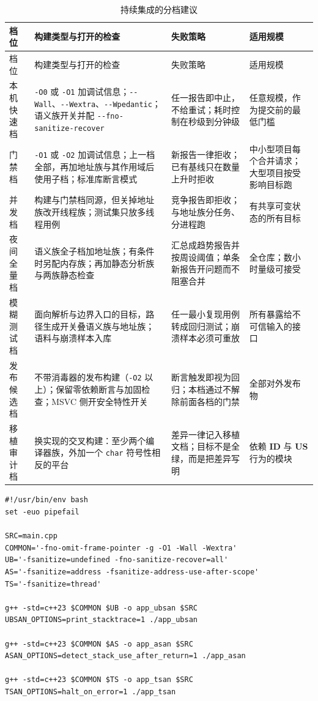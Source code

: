 \documentclass[12pt,a4paper,fontset=fandol]{ctexbook}
\newcommand{\Tp}[1]{\texttt{#1}}
\newcommand{\Opt}[1]{\texttt{-\/-#1}}
\newcommand{\Bk}{\discretionary{}{}{}}
\newcommand{\IDB}{\textbf{\textsf{ID}}}
\newcommand{\USB}{\textbf{\textsf{US}}}
\newcommand{\Mx}[1]{\textsf{#1}}
\begin{document}
\begin{longtable}{@{}>{\raggedright\arraybackslash}p{} >{\raggedright\arraybackslash}p{} >{\raggedright\arraybackslash}p{} >{\raggedright\arraybackslash}p{}@{}}
\caption{持续集成的分档建议}\label{tab:apB-ci}\\
\toprule
档位 & 构建类型与打开的检查 & 失败策略 & 适用规模 \\
\midrule
\endfirsthead
\toprule
档位 & 构建类型与打开的检查 & 失败策略 & 适用规模 \\
\midrule
\endhead
\bottomrule
\endfoot
本机快速档 & \Tp{-O0} 或 \Tp{-O1} 加调试信息；\Opt{Wall}、\Opt{Wextra}、\Opt{Wpedantic}；语义族开关并配 \Opt{fno-{\Bk}sanitize-{\Bk}recover} & 任一报告即中止，不给重试；耗时控制在秒级到分钟级 & 任意规模，作为提交前的最低门槛 \\
门禁档 & \Tp{-O1} 或 \Tp{-O2} 加调试信息；上一档全部，再加地址族与其作用域后使用子档；标准库断言模式 & 新报告一律拒收；已有基线只在数量上升时拒收 & 中小型项目每个合并请求；大型项目按受影响目标跑 \\
并发档 & 构建与门禁档同源，但关掉地址族改开线程族；测试集只放多线程用例 & 竞争报告即拒收；与地址族分任务、分进程跑 & 有共享可变状态的所有目标 \\
夜间全量档 & 语义族全子档加地址族；有条件时另配内存族；再加静态分析族与两族静态检查 & 汇总成趋势报告并按周设阈值；单条新报告开问题而不阻塞合并 & 全仓库；数小时量级可接受 \\
模糊测试档 & 面向解析与边界入口的目标，路径生成开关叠语义族与地址族；语料与崩溃样本入库 & 任一最小复现用例转成回归测试；崩溃样本必须可重放 & 所有暴露给不可信输入的接口 \\
发布候选档 & 不带消毒器的发布构建（\Tp{-O2} 以上）；保留零依赖断言与加固检查；\Mx{MSVC} 侧开安全特性开关 & 断言触发即视为回归；本档通过不解除前面各档的门禁 & 全部对外发布物 \\
移植审计档 & 换实现的交叉构建：至少两个编译器族，外加一个 \Tp{char} 符号性相反的平台 & 差异一律记入移植文档；目标不是全绿，而是把差异写明 & 依赖 \IDB{} 与 \USB{} 行为的模块 \\
\end{longtable}

\begin{lstlisting}[style=shellstyle, caption={最小门禁脚本：互斥的两族分进程、分产物跑}]
#!/usr/bin/env bash
set -euo pipefail

SRC=main.cpp
COMMON='-fno-omit-frame-pointer -g -O1 -Wall -Wextra'
UB='-fsanitize=undefined -fno-sanitize-recover=all'
AS='-fsanitize=address -fsanitize-address-use-after-scope'
TS='-fsanitize=thread'

g++ -std=c++23 $COMMON $UB -o app_ubsan $SRC
UBSAN_OPTIONS=print_stacktrace=1 ./app_ubsan

g++ -std=c++23 $COMMON $AS -o app_asan $SRC
ASAN_OPTIONS=detect_stack_use_after_return=1 ./app_asan

g++ -std=c++23 $COMMON $TS -o app_tsan $SRC
TSAN_OPTIONS=halt_on_error=1 ./app_tsan
\end{lstlisting}
\end{document}
